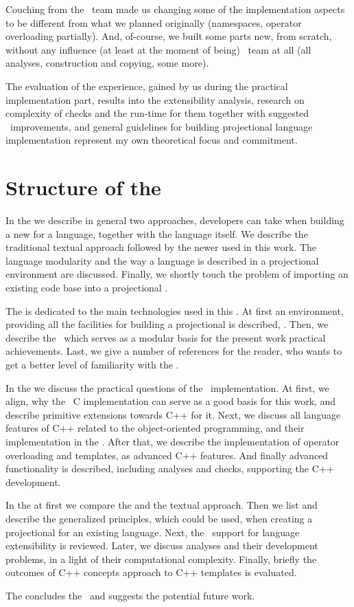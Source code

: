 Couching from the \mbdr\ team made us changing some of the implementation aspects to be different from what we planned originally (namespaces,
operator overloading partially). And, of-course, we built some parts new, from scratch, without any influence (at least at the moment of being) \mbdr\ team 
at all (all analyses, construction and copying, some more). 

The evaluation of the experience, gained by us during the practical implementation part, results into the extensibility analysis, 
research on complexity of checks and the run-time for them together with suggested \jbmps\ improvements, and general guidelines 
for building projectional language implementation represent my own theoretical focus and commitment.

\section{Structure of the \MT}

In the  we describe in general two approaches,  developers can take when
building a new  for a language, together with the language itself. We describe the traditional 
textual approach followed by the newer  used in this work. The language 
modularity and the way a language is described in a projectional environment are discussed. Finally,
we shortly touch the problem of importing an existing code base into a projectional .

The  is dedicated to the main technologies used in this \MT. At first an environment, providing
all the facilities for building a projectional  is described, \jbmps. Then, we describe the \mbdp\
which serves as a modular basis for the present work practical achievements. Last, we give a number of 
references for the reader, who wants to get a better level of familiarity with the \cpppl.

In the  we discuss the practical questions of the \pcpp\ implementation. At first, we align,
why the \mbdr\ C implementation can serve as a good basis for this work, and describe primitive 
extensions towards C++ for it. Next, we discuss all language features of C++ related to the 
object-oriented programming, and their implementation in the \pcpp. After that, we describe the implementation
of operator overloading and templates, as advanced C++ features. And finally advanced \rg{ide} functionality
is described, including analyses and checks, supporting the C++ development.

In the  at first we compare the  and the textual approach. Then we list and describe
the generalized principles, which could be used, when creating a projectional \rg{ide} for an existing language. Next, the 
\jbmps\ support for language extensibility is reviewed. Later, we discuss analyses and their development problems, in a light of 
their computational complexity. Finally, briefly the outcomes of C++ concepts approach to C++ templates is evaluated.

The  concludes the \MT\ and suggests the potential future work.


